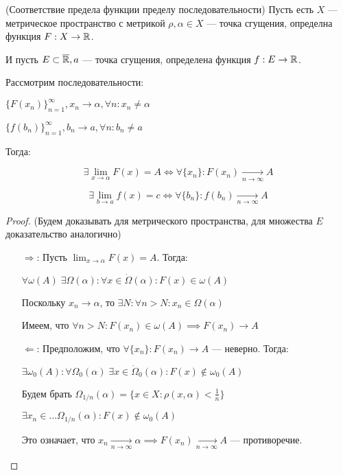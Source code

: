 \begin{theorem} (Соответствие предела функции пределу последовательности)
    Пусть есть $X$ --- метрическое пространство с метрикой $\rho, \alpha \in X$ --- точка сгущения, определна функция $F: X \to \mathbb{R}$.

    И пусть $E \subset \overline{\mathbb{R}}, a$ --- точка сгущения, определена функция $f: E \to \mathbb{R}$.

    Рассмотрим последовательности: 
    
    $\{F(x_n)\}_{n=1}^{\infty}, x_n \to \alpha, \forall n: x_n \neq \alpha$

    $\{f(b_n)\}_{n=1}^{\infty}, b_n \to a, \forall n: b_n \neq a$

    Тогда:

    $$\exists \lim_{x \to \alpha} F(x) = A \Leftrightarrow \forall \{x_n\}: F(x_n) \underset{n \to \infty}{\to} A$$

    $$\exists \lim_{b \to a} f(x) = c \Leftrightarrow \forall \{b_n\}: f(b_n) \underset{n \to \infty}{\to} A$$

\end{theorem}

\begin{proof} (Будем доказывать для метрического пространства, для множества $E$ доказательство аналогично)
    \begin{itemize}
        \item[$\Rightarrow$:] Пусть $\lim_{x \to \alpha} F(x) = A$. Тогда:
        
        $\forall \omega(A) \; \exists \Omega(\alpha): \forall x \in \dot{\Omega}(\alpha): F(x) \in \omega(A)$

        Поскольку $x_n \to \alpha$, то $\exists N: \forall n > N: x_n \in \Omega(\alpha)$

        Имеем, что $\forall n > N: F(x_n) \in \omega(A) \implies F(x_n) \to A$
        

        \item[$\Leftarrow$:] Предположим, что $\forall \{x_n\}: F(x_n) \to A$ --- неверно. Тогда:
        
        $\exists \omega_0(A): \forall \Omega_0(\alpha) \; \exists x \in \dot{\Omega}_0(\alpha): F(x) \notin \omega_0(A)$

        Будем брать $\Omega_{1/n}(\alpha) = \{x \in X: \rho(x, \alpha) < \frac{1}{n}\}$

        $\exists x_n \in \dots{\Omega}_{1/n}(\alpha): F(x) \notin \omega_0(A)$

        Это означает, что $x_n \underset{n \to \infty}{\to} \alpha \implies F(x_n) \underset{n \to \infty}{\to} A$ --- противоречие.
    \end{itemize}
\end{proof}

